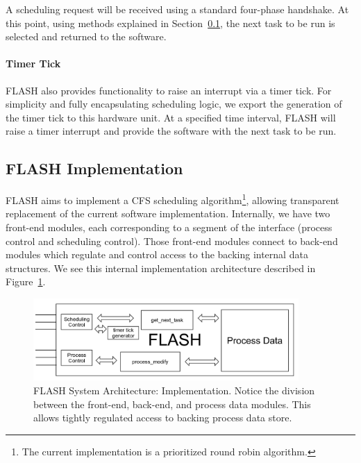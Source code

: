 \documentclass{sig-alternate-10pt}
\begin{document}
A scheduling request will be received using a standard four-phase handshake.
At this point, using methods explained in Section~\ref{sec:FLASH_impl}, the
next task to be run is selected and returned to the software.

\paragraph{Timer Tick}
FLASH also provides functionality to raise an interrupt via a timer tick.
For simplicity and fully encapsulating scheduling logic, we export the
generation of the timer tick to this hardware unit.  At a specified time
interval, FLASH will raise a timer interrupt and provide the software with
the next task to be run.

\subsection{FLASH Implementation}
\label{sec:FLASH_impl}
FLASH aims to implement a CFS scheduling algorithm\footnote{The current
implementation is a prioritized round robin algorithm.}, allowing
transparent replacement of the current software implementation.  Internally,
we have two front-end modules, each corresponding to a segment of the
interface (process control and scheduling control). Those front-end modules
connect to back-end modules which regulate and control access to the backing
internal data structures.  We see this internal implementation architecture
described in Figure~\ref{fig:impl_overview}.

\begin{figure}
	\begin{center}
		\includegraphics[width=0.9\textwidth]{fig/flash-impl.png}
		\caption{
			FLASH System Architecture: Implementation.  Notice the division
			between the front-end, back-end, and process data modules.  This
			allows tightly regulated access to backing process data store.
		}
		\label{fig:impl_overview}
	\end{center}
\end{figure}
\end{document}
